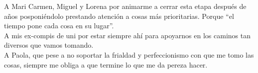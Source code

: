        \vspace{1cm}


A Mari Carmen, Miguel y Lorena por animarme a cerrar esta etapa después de años posponiéndolo prestando atención a cosas más prioritarias. Porque ``el tiempo pone cada cosa en su lugar''.\\

A mis ex-compis de uni por estar siempre ahí para apoyarnos en los caminos tan diversos que vamos tomando.\\

A Paola, que pese a no soportar la frialdad y perfeccionismo con que me tomo las cosas, siempre me obliga a que termine lo que me da pereza hacer.

